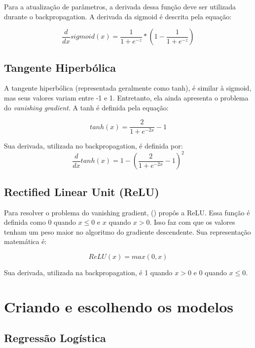 \documentclass[conference]{IEEEtran}
\begin{document}
	Para a atualização de parâmetros, a derivada dessa função deve ser utilizada durante o backpropagation. A derivada da sigmoid é descrita pela equação:
	

\begin{equation}
\dfrac{d}{dx}sigmoid(x) = \dfrac{1}{1 + e^{-z}} * (1 - \dfrac{1}{1 + e^{-z}})
\end{equation}	

\subsection{Tangente Hiperbólica}
  
	A tangente hiperbólica (representada geralmente como tanh), é similar à sigmoid, mas seus valores variam entre -1 e 1. Entretanto, ela ainda apresenta o problema do \textit{vanishing gradient}. A tanh é definida pela equação:
  
\begin{equation}
tanh(x) = \dfrac{2}{1+e^{-2x}} - 1
\end{equation}

	Sua derivada, utilizada no backpropagation, é definida por:
\begin{equation}
\dfrac{d}{dx}tanh(x) =  1 - (\dfrac{2}{1+e^{-2x}} - 1)^2
\end{equation}	

\subsection{Rectified Linear Unit (ReLU)}

	Para resolver o problema do vanishing gradient, \citeauthor{nair2010rectified} (\citeyear{nair2010rectified}) propôs a ReLU. Essa função é definida como 0 quando $x	\leq 0$ e $x$ quando $x>0$. Isso faz com que os valores tenham um peso maior no algoritmo do gradiente descendente. Sua representação matemática é:
	
\begin{equation}
ReLU(x) =  max(0,x)
\end{equation}

	Sua derivada, utilizada na backpropagation, é 1 quando $x>0$ e 0 quando $x \leq 0$.
	
\section{Criando e escolhendo os modelos}

\subsection{Regressão Logística}
\end{document}
